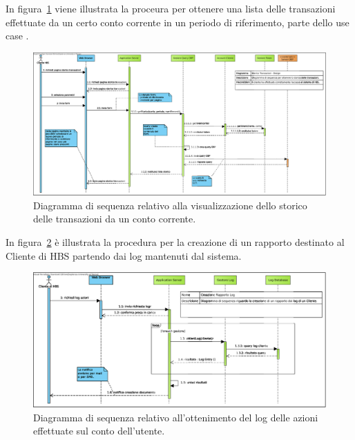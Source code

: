 In figura~\ref{fig:sequenza:storico} viene illustrata la proceura per ottenere una lista delle transazioni effettuate da un certo conto corrente in un periodo di riferimento, parte dello use case \iducVERSTOR.

\begin{figure}[h]
    \centering
	\includegraphics[width=\textheight, angle=90]{Images/sequence/Storico_Transazioni_-_Design.eps}
    \caption{Diagramma di sequenza relativo alla visualizzazione dello storico delle transazioni da un conto corrente.}
    \label{fig:sequenza:storico}
\end{figure}

In figura~\ref{fig:sequenza:log} \`e illustrata la procedura per la creazione di un rapporto destinato al Cliente di HBS partendo dai log mantenuti dal sistema.

\begin{figure}[h]
    \centering
	\includegraphics[width=\textheight, angle=90]{Images/Logging_Sequence.eps}
    \caption{Diagramma di sequenza relativo all'ottenimento del log delle azioni effettuate sul conto dell'utente.}
    \label{fig:sequenza:log}
\end{figure}


